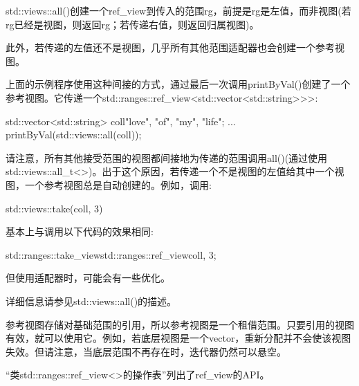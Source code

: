 std::views::all()创建一个ref\_view到传入的范围rg，前提是rg是左值，而非视图(若rg已经是视图，则返回rg；若传递右值，则返回归属视图)。

此外，若传递的左值还不是视图，几乎所有其他范围适配器也会创建一个参考视图。

上面的示例程序使用这种间接的方式，通过最后一次调用printByVal()创建了一个参考视图。它传递一个std::ranges::ref\_view<std::vector<std::string>{}>{}>:

\begin{cpp}
std::vector<std::string> coll{"love", "of", "my", "life"};
...
printByVal(std::views::all(coll));
\end{cpp}

请注意，所有其他接受范围的视图都间接地为传递的范围调用all()(通过使用std::views::all\_t<>)。出于这个原因，若传递一个不是视图的左值给其中一个视图，一个参考视图总是自动创建的。例如，调用:

\begin{cpp}
std::views::take(coll, 3)
\end{cpp}

基本上与调用以下代码的效果相同:

\begin{cpp}
std::ranges::take_view{std::ranges::ref_view{coll}, 3};
\end{cpp}

但使用适配器时，可能会有一些优化。

详细信息请参见std::views::all()的描述。


参考视图存储对基础范围的引用，所以参考视图是一个租借范围。只要引用的视图有效，就可以使用它。例如，若底层视图是一个vector，重新分配并不会使该视图失效。但请注意，当底层范围不再存在时，迭代器仍然可以悬空。


“类std::ranges::ref\_view<>的操作表”列出了ref\_view的API。

